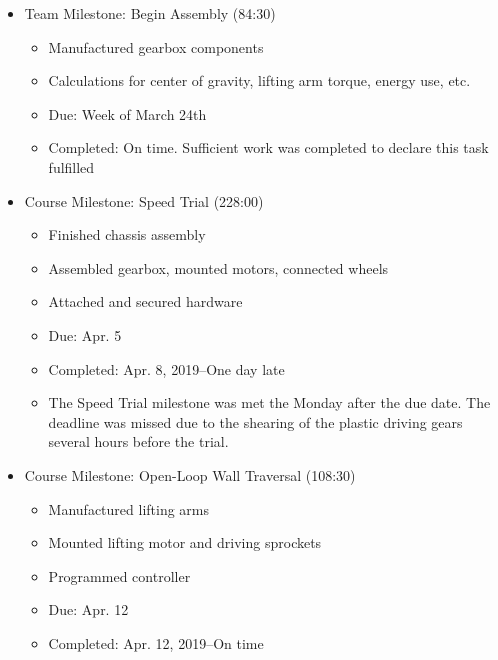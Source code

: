 \begin{itemize}
\item Team Milestone: Begin Assembly (84:30)
\begin{itemize}
\item Manufactured gearbox components 
\item Calculations for center of gravity, lifting arm torque, energy use, etc.
\item Due: Week of March 24th
\item Completed: On time. Sufficient work was completed to declare this task fulfilled
\end{itemize}
\end{itemize}
\begin{itemize}
\begin{itemize}
\item Course Milestone: PDR (50:40)
\begin{itemize}
\item Due: Apr. 4
\item Completed: Apr. 4, 2019--On time
\end{itemize}
\end{itemize}
\item Course Milestone: Speed Trial (228:00)
\begin{itemize}
\item Finished chassis assembly
\item Assembled gearbox, mounted motors, connected wheels 
\item Attached and secured hardware
\item Due: Apr. 5
\item Completed: Apr. 8, 2019--One day late
\item The Speed Trial milestone was met the Monday after the due date. The deadline was missed due to the shearing of the plastic driving gears several hours before the trial.
\end{itemize} 
\end{itemize}
\begin{itemize}
\item Course Milestone: Open-Loop Wall Traversal (108:30)
\begin{itemize}
\item Manufactured lifting arms 
\item Mounted lifting motor and driving sprockets
\item Programmed controller
\item Due: Apr. 12
\item Completed: Apr. 12, 2019--On time
\end{itemize}
\end{itemize}
